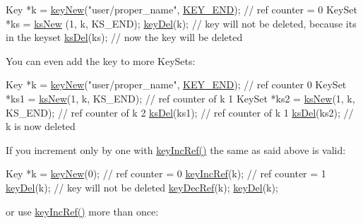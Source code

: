 \begin{DoxyCodeInclude}
Key *k = \hyperlink{group__key_gad23c65b44bf48d773759e1f9a4d43b89}{keyNew}(\textcolor{stringliteral}{"user/proper\_name"}, \hyperlink{group__key_gga91fb3178848bd682000958089abbaf40aa8adb6fcb92dec58fb19410eacfdd403}{KEY\_END}); \textcolor{comment}{// ref counter = 0}
KeySet *ks = \hyperlink{group__keyset_ga671e1aaee3ae9dc13b4834a4ddbd2c3c}{ksNew} (1, k, KS\_END);
\hyperlink{group__key_ga3df95bbc2494e3e6703ece5639be5bb1}{keyDel}(k); \textcolor{comment}{// key will not be deleted, because its in the keyset}
\hyperlink{group__keyset_ga27e5c16473b02a422238c8d970db7ac8}{ksDel}(ks); \textcolor{comment}{// now the key will be deleted}
\end{DoxyCodeInclude}
 You can even add the key to more Key\-Sets\-:


\begin{DoxyCodeInclude}
Key *k = \hyperlink{group__key_gad23c65b44bf48d773759e1f9a4d43b89}{keyNew}(\textcolor{stringliteral}{"user/proper\_name"}, \hyperlink{group__key_gga91fb3178848bd682000958089abbaf40aa8adb6fcb92dec58fb19410eacfdd403}{KEY\_END}); \textcolor{comment}{// ref counter 0}
KeySet *ks1 = \hyperlink{group__keyset_ga671e1aaee3ae9dc13b4834a4ddbd2c3c}{ksNew}(1, k, KS\_END); \textcolor{comment}{// ref counter of k 1}
KeySet *ks2 = \hyperlink{group__keyset_ga671e1aaee3ae9dc13b4834a4ddbd2c3c}{ksNew}(1, k, KS\_END); \textcolor{comment}{// ref counter of k 2}
\hyperlink{group__keyset_ga27e5c16473b02a422238c8d970db7ac8}{ksDel}(ks1); \textcolor{comment}{// ref counter of k 1}
\hyperlink{group__keyset_ga27e5c16473b02a422238c8d970db7ac8}{ksDel}(ks2); \textcolor{comment}{// k is now deleted}
\end{DoxyCodeInclude}
 If you increment only by one with \hyperlink{group__key_ga6970a6f254d67af7e39f8e469bb162f1}{key\-Inc\-Ref()} the same as said above is valid\-:


\begin{DoxyCodeInclude}
Key *k = \hyperlink{group__key_gad23c65b44bf48d773759e1f9a4d43b89}{keyNew}(0); \textcolor{comment}{// ref counter = 0}
\hyperlink{group__key_ga6970a6f254d67af7e39f8e469bb162f1}{keyIncRef}(k); \textcolor{comment}{// ref counter = 1}
\hyperlink{group__key_ga3df95bbc2494e3e6703ece5639be5bb1}{keyDel}(k); \textcolor{comment}{// key will not be deleted}
\hyperlink{group__key_ga2c6433ca22109e4e141946057eccb283}{keyDecRef}(k);
\hyperlink{group__key_ga3df95bbc2494e3e6703ece5639be5bb1}{keyDel}(k);
\end{DoxyCodeInclude}
 or use \hyperlink{group__key_ga6970a6f254d67af7e39f8e469bb162f1}{key\-Inc\-Ref()} more than once\-:


